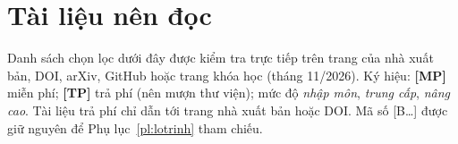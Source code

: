 \chapter{Tài liệu nên đọc}
\label{pl:tailieu}

Danh sách chọn lọc dưới đây được kiểm tra trực tiếp trên trang của nhà xuất bản, DOI, arXiv, GitHub hoặc trang khóa học (tháng 11/2026). Ký hiệu: \textbf{[MP]} miễn phí; \textbf{[TP]} trả phí (nên mượn thư viện); mức độ \emph{nhập môn}, \emph{trung cấp}, \emph{nâng cao}. Tài liệu trả phí chỉ dẫn tới trang nhà xuất bản hoặc DOI. Mã số [B\ldots] được giữ nguyên để Phụ lục~\ref{pl:lotrinh} tham chiếu.

\newcommand{\tl}[3]{\item[{[#1]}] #2\newline{\small\color{ctext2}#3}}
\newenvironment{dstl}{\begin{description}[leftmargin=1.2cm,labelwidth=1.0cm,itemsep=3pt,font=\normalfont\sffamily\small]}{\end{description}}

